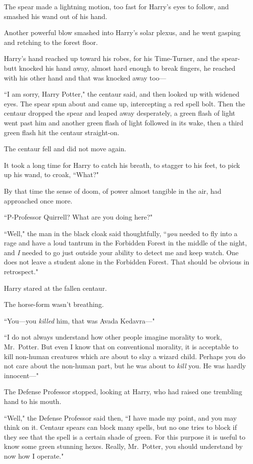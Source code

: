 The spear made a lightning motion, too fast for Harry's eyes to follow, and smashed his wand out of his hand.

Another powerful blow smashed into Harry's solar plexus, and he went gasping and retching to the forest floor.

Harry's hand reached up toward his robes, for his Time-Turner, and the spear-butt knocked his hand away, almost hard enough to break fingers, he reached with his other hand and that was knocked away too---

``I am sorry, Harry Potter," the centaur said, and then looked up with widened eyes. The spear spun about and came up, intercepting a red spell bolt. Then the centaur dropped the spear and leaped away desperately, a green flash of light went past him and another green flash of light followed in its wake, then a third green flash hit the centaur straight-on.

The centaur fell and did not move again.

It took a long time for Harry to catch his breath, to stagger to his feet, to pick up his wand, to croak, ``What?"

By that time the sense of doom, of power almost tangible in the air, had approached once more.

``P-Professor Quirrell? What are you doing here?"

``Well," the man in the black cloak said thoughtfully, ``\emph{you} needed to fly into a rage and have a loud tantrum in the Forbidden Forest in the middle of the night, and \emph{I} needed to go just outside your ability to detect me and keep watch. One does not leave a student alone in the Forbidden Forest. That should be obvious in retrospect."

Harry stared at the fallen centaur.

The horse-form wasn't breathing.

``You---you \emph{killed} him, that was Avada Kedavra---"

``I do not always understand how other people imagine morality to work, Mr.~Potter. But even I know that on conventional morality, it is acceptable to kill non-human creatures which are about to slay a wizard child. Perhaps you do not care about the non-human part, but he was about to \emph{kill} you. He was hardly innocent---"

The Defense Professor stopped, looking at Harry, who had raised one trembling hand to his mouth.

``Well," the Defense Professor said then, ``I have made my point, and you may think on it. Centaur spears can block many spells, but no one tries to block if they see that the spell is a certain shade of green. For this purpose it is useful to know some green stunning hexes. Really, Mr.~Potter, you should understand by now how I operate."

